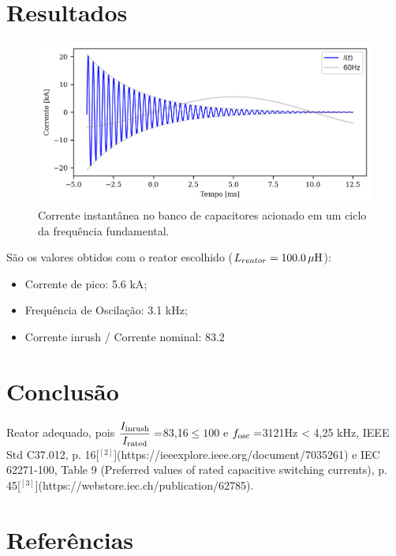 \documentclass[a4paper]{article}
\begin{document}
\section{Resultados}
\begin{figure}[!hbp]
	\centering
	\includegraphics{Correntes.png}
	\caption{Corrente instantânea no banco de capacitores acionado em um ciclo da frequência fundamental.}
	\label{fig:picture2}
\end{figure}

São os valores obtidos com o reator escolhido ($L_{reator} = {{100.0}} \, \mu \rm{H} $):
\begin{itemize}[label=\textendash]
	\item	Corrente de pico: {{5.6 kA}};
	\item	Frequência de Oscilação: {{3.1 k}}Hz;
	\item	Corrente inrush / Corrente nominal: {{83.2}}
\end{itemize}

\section{Conclusão}
{{Reator adequado, pois $\dfrac{I_{\rm inrush}}{I_{\rm rated}} = $83,16$\le 100$ e $f_{\rm osc} = $3121Hz < 4,25 kHz, IEEE Std C37.012, p. 16[$^{[2]}$](https://ieeexplore.ieee.org/document/7035261) e IEC 62271-100, Table 9 (Preferred values of rated capacitive switching currents), p. 45[$^{[3]}$](https://webstore.iec.ch/publication/62785).}}

\section{Referências}
\end{document}
